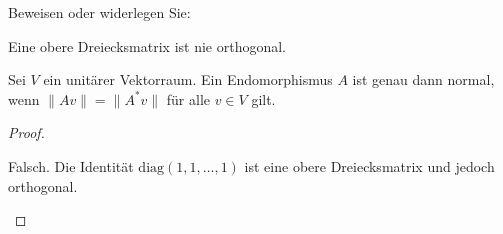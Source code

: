 \begin{Problem}
	Beweisen oder widerlegen Sie:
	\begin{parts}
	\item Eine obere Dreiecksmatrix ist nie orthogonal.
	\item Sei $V$ ein unitärer Vektorraum. Ein Endomorphismus $A$ ist genau dann normal, wenn $\|Av\|=\|A^*v\|$ f\"{u}r alle $v\in V$ gilt.  
	\end{parts}
\end{Problem}

\begin{proof}
	\begin{parts}
	\item Falsch. Die Identität $\text{diag}(1,1,\dots, 1)$ ist eine obere Dreiecksmatrix und jedoch orthogonal.\qedhere
	\end{parts}
\end{proof}

